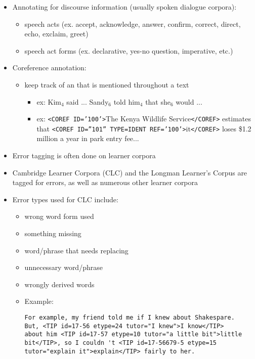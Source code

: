 \documentclass[a4paper,landscape,headrule,footrule,xetex]{foils}
\begin{document}
\begin{itemize}
\item  Annotating for discourse information (usually spoken
  dialogue corpora):
  \begin{itemize}
  \item  speech acts (ex. accept, acknowledge, answer, confirm, correct, direct,
    echo, exclaim, greet)
  \item  speech act forms (ex. declarative, yes-no question, imperative, etc.)
  \end{itemize}
\item  Coreference annotation:
  \begin{itemize}
  \item  keep track of an  that is mentioned throughout a text
    \begin{itemize}
    \item  ex: Kim$_4$ said ... Sandy$_6$ told him$_4$ that she$_6$ would ...
    \item  ex: \texttt{<COREF ID='100'>}The Kenya Wildlife Service\texttt{</COREF>} estimates
      that \texttt{<COREF ID=”101” TYPE=IDENT REF='100'>}it\texttt{</COREF>} loses \$1.2
      million a year in park entry fee...
    \end{itemize}
  \end{itemize}
\end{itemize}

\begin{itemize}
\item  Error tagging is often done on learner corpora
\item  Cambridge Learner Corpora (CLC) and the Longman Learner’s Corpus
are tagged for errors, as well as numerous other learner corpora
\item  Error types used for CLC include:
  \begin{itemize}
  \item  wrong word form used
  \item  something missing
  \item  word/phrase that needs replacing
  \item  unnecessary word/phrase
  \item  wrongly derived words
\newpage    
  \item  Example: 
\begin{verbatim}
For example, my friend told me if I knew about Shakespare. 
But, <TIP id=17-56 etype=24 tutor="I knew">I know</TIP> 
about him <TIP id=17-57 etype=10 tutor="a little bit">little 
bit</TIP>, so I couldn 't <TIP id=17-56679-5 etype=15 
tutor="explain it">explain</TIP> fairly to her.
\end{verbatim}

  \end{itemize}
\end{itemize}
\end{document}
